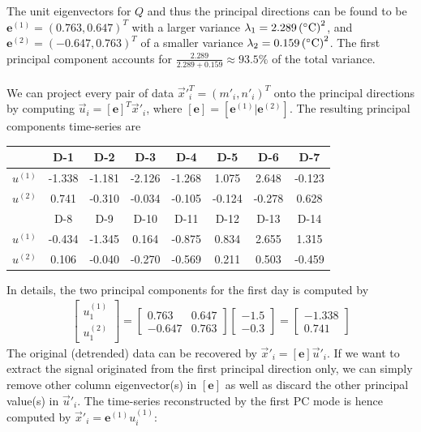 \begin{solution}
The unit eigenvectors for $Q$ and thus the principal directions can be found to be $\textbf{e}^{(1)} = (0.763, 0.647)^T$ with a larger variance $\lambda_1 = \SI{2.289}{\square {(\degree C)}}$, and $\textbf{e}^{(2)} = (-0.647, 0.763)^T$ of a smaller variance $\lambda_2 = \SI{0.159}{\square {(\degree C)}}$. The first principal component accounts for $\frac{2.289}{2.289+0.159} \approx 93.5\%$ of the total variance.\\
\\
We can project every pair of data $\vec{x}'^T_i = (m'_i, n'_i)^T$ onto the principal directions by computing $\vec{u}_i = [\textbf{e}]^T\vec{x}'_i$, where $[\textbf{e}] = [\textbf{e}^{(1)}|\textbf{e}^{(2)}]$. The resulting principal components time-series are 
\begin{center}
\begin{tabular}{|c|c|c|c|c|c|c|c|}
\hline
 & D-1 & D-2 & D-3 & D-4 & D-5 & D-6 & D-7 \\
\hline
$u^{(1)}$ & -1.338 & -1.181 & -2.126 & -1.268 & 1.075 & 2.648 & -0.123 \\
\hline
$u^{(2)}$ & 0.741 & -0.310 & -0.034 & -0.105 & -0.124 & -0.278 & 0.628 \\
\hline
 & D-8 & D-9 & D-10 & D-11 & D-12 & D-13 & D-14 \\
\hline
$u^{(1)}$ & -0.434 & -1.345 & 0.164 & -0.875 & 0.834 & 2.655 & 1.315 \\
\hline
$u^{(2)}$ & 0.106 & -0.040 & -0.270 & -0.569 & 0.211 & 0.503 & -0.459 \\
\hline
\end{tabular}
\end{center}
In details, the two principal components for the first day is computed by
\begin{align*}
\begin{bmatrix}
u_1^{(1)} \\
u_1^{(2)} 
\end{bmatrix}
=
\begin{bmatrix}
0.763 & 0.647 \\
-0.647 & 0.763
\end{bmatrix}
\begin{bmatrix}
-1.5 \\
-0.3
\end{bmatrix}
=
\begin{bmatrix}
-1.338\\
0.741
\end{bmatrix}
\end{align*}
The original (detrended) data can be recovered by $\vec{x}'_i = [\textbf{e}]\vec{u}'_i$. If we want to extract the signal originated from the first principal direction only, we can simply remove other column eigenvector(s) in $[\textbf{e}]$ as well as discard the other principal value(s) in $\vec{u}'_i$. The time-series reconstructed by the first PC mode is hence computed by $\vec{x}'_i = \textbf{e}^{(1)}u_i^{(1)}$:

\end{solution}
